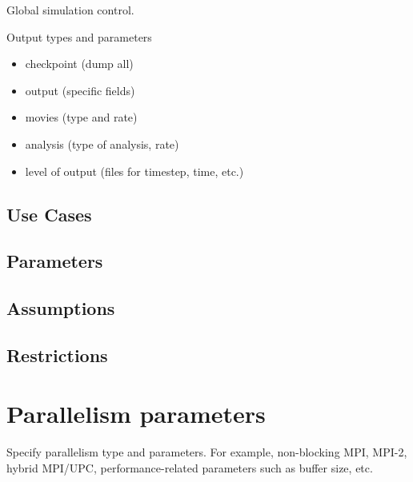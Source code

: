\documentclass{book}
\begin{document}
Global simulation control.

Output types and parameters

\begin{itemize}
\item checkpoint (dump all)
\item output (specific fields)
\item movies (type and rate)
\item analysis (type of analysis, rate)
\item level of output (files for timestep, time, etc.)
\end{itemize}

\subsection{Use Cases}
\subsection{Parameters}
\subsection{Assumptions}
\subsection{Restrictions}

\section{Parallelism parameters} \label{s:parallel}

Specify parallelism type and parameters.  For example, non-blocking
MPI, MPI-2, hybrid MPI/UPC, performance-related parameters such as
buffer size, etc.
\end{document}
